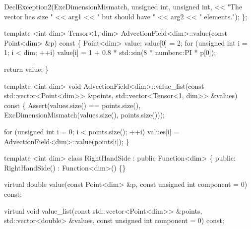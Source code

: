 \begin{DoxyCodeInclude}
    DeclException2(ExcDimensionMismatch, \textcolor{keywordtype}{unsigned} \textcolor{keywordtype}{int}, \textcolor{keywordtype}{unsigned} \textcolor{keywordtype}{int},
                   << \textcolor{stringliteral}{"The vector has size "} << arg1 << \textcolor{stringliteral}{" but should have "}
                   << arg2 << \textcolor{stringliteral}{" elements."});
\};


\textcolor{keyword}{template} <\textcolor{keywordtype}{int} dim>
Tensor<1, dim> AdvectionField<dim>::value(\textcolor{keyword}{const} Point<dim> &p)\textcolor{keyword}{ const}
\textcolor{keyword}{}\{
    Point<dim> value;
    value[0] = 2;
    \textcolor{keywordflow}{for} (\textcolor{keywordtype}{unsigned} \textcolor{keywordtype}{int} i = 1; i < dim; ++i)
        value[i] = 1 + 0.8 * std::sin(8 * numbers::PI * p[0]);

    \textcolor{keywordflow}{return} value;
\}


\textcolor{keyword}{template} <\textcolor{keywordtype}{int} dim>
\textcolor{keywordtype}{void} AdvectionField<dim>::value\_list(\textcolor{keyword}{const} std::vector<Point<dim>> &points,
                                     std::vector<Tensor<1, dim>> &values)\textcolor{keyword}{ const}
\textcolor{keyword}{}\{
    Assert(values.size() == points.size(),
           ExcDimensionMismatch(values.size(), points.size()));

    \textcolor{keywordflow}{for} (\textcolor{keywordtype}{unsigned} \textcolor{keywordtype}{int} i = 0; i < points.size(); ++i)
        values[i] = AdvectionField<dim>::value(points[i]);
\}


\textcolor{keyword}{template} <\textcolor{keywordtype}{int} dim>
\textcolor{keyword}{class }RightHandSide : \textcolor{keyword}{public} Function<dim> \{
\textcolor{keyword}{public}:
    RightHandSide() : Function<dim>() \{\}

    \textcolor{keyword}{virtual} \textcolor{keywordtype}{double} value(\textcolor{keyword}{const} Point<dim> &p,
                         \textcolor{keyword}{const} \textcolor{keywordtype}{unsigned} \textcolor{keywordtype}{int} component = 0) \textcolor{keyword}{const};

    \textcolor{keyword}{virtual} \textcolor{keywordtype}{void} value\_list(\textcolor{keyword}{const} std::vector<Point<dim>> &points,
                            std::vector<double> &values,
                            \textcolor{keyword}{const} \textcolor{keywordtype}{unsigned} \textcolor{keywordtype}{int} component = 0) \textcolor{keyword}{const};


\end{DoxyCodeInclude}
